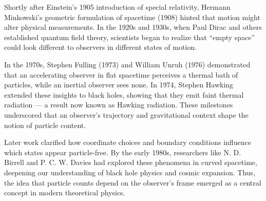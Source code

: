 \begin{historical}
Shortly after Einstein’s 1905 introduction of special relativity, Hermann Minkowski’s geometric formulation of spacetime (1908) hinted that motion might alter physical measurements. In the 1920s and 1930s, when Paul Dirac and others established quantum field theory, scientists began to realize that “empty space” could look different to observers in different states of motion.

In the 1970s, Stephen Fulling (1973) and William Unruh (1976) demonstrated that an accelerating observer in flat spacetime perceives a thermal bath of particles, while an inertial observer sees none. In 1974, Stephen Hawking extended these insights to black holes, showing that they emit faint thermal radiation — a result now known as Hawking radiation. These milestones underscored that an observer’s trajectory and gravitational context shape the notion of particle content.

Later work clarified how coordinate choices and boundary conditions influence which states appear particle-free. By the early 1980s, researchers like N. D. Birrell and P. C. W. Davies had explored these phenomena in curved spacetime, deepening our understanding of black hole physics and cosmic expansion. Thus, the idea that particle counts depend on the observer’s frame emerged as a central concept in modern theoretical physics.
\end{historical}